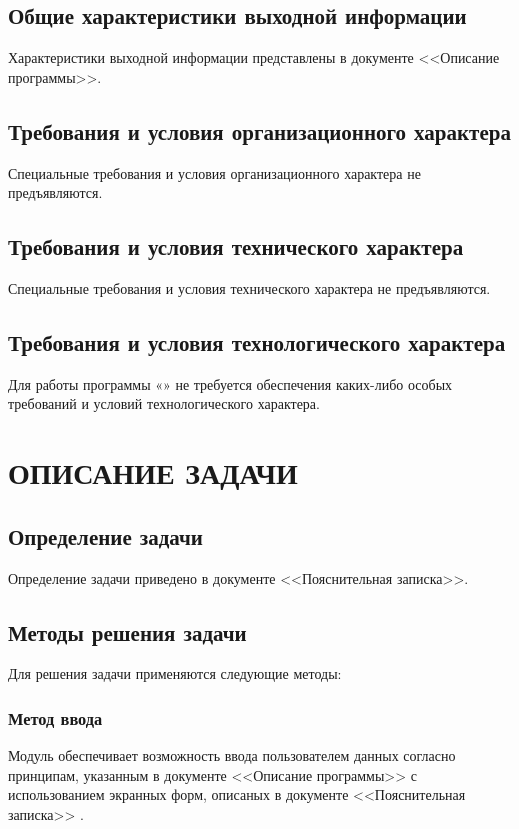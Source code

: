 \documentclass[14pt,a4paper,final]{extreport}
\begin{document}
\section{Общие характеристики выходной информации}
Характеристики выходной информации представлены в документе <<Описание программы>>.


\section{Требования и условия организационного характера}
Специальные требования и условия организационного характера не предъявляются.
               
\section{Требования и условия технического характера}
Специальные требования и условия технического характера не предъявляются.
               
\section{Требования и условия технологического характера}
Для работы программы «\programtitle» не требуется обеспечения каких-либо особых требований и условий технологического характера.
               
\chapter{ОПИСАНИЕ ЗАДАЧИ}
\section{Определение задачи}
Определение задачи приведено в документе <<Пояснительная записка>>.

\section{Методы решения задачи}
Для решения задачи применяются следующие методы:

\subsection{Метод ввода}
Модуль обеспечивает возможность ввода пользователем данных согласно принципам,
указанным в документе <<Описание программы>> с использованием экранных форм,
описаных в документе <<Пояснительная записка>> .
\end{document}
